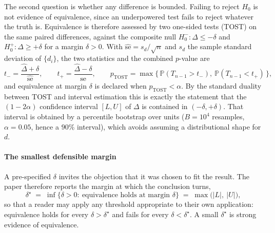 \documentclass[preprint,12pt]{elsarticle}
\begin{document}
The second question is whether any difference is bounded. Failing to reject $H_0$ is not evidence of
equivalence, since an underpowered test fails to reject whatever the truth is. Equivalence is therefore
assessed by two one-sided tests (TOST) on the same paired differences, against the composite null
$H_0^{-}: \Delta \le -\delta$ and $H_0^{+}: \Delta \ge +\delta$ for a margin $\delta > 0$. With
$\widehat{\mathrm{se}} = s_d/\sqrt{n}$ and $s_d$ the sample standard deviation of $\{d_i\}$, the two statistics
and the combined $p$-value are
\begin{equation}
t_{-} = \frac{\hat{\Delta}+\delta}{\widehat{\mathrm{se}}}, \qquad
t_{+} = \frac{\hat{\Delta}-\delta}{\widehat{\mathrm{se}}}, \qquad
p_{\text{TOST}} = \max\!\big\{\,\mathbb{P}(T_{n-1} > t_{-}),\ \mathbb{P}(T_{n-1} < t_{+})\,\big\},
\end{equation}
and equivalence at margin $\delta$ is declared when $p_{\text{TOST}} < \alpha$. By the standard duality between
TOST and interval estimation this is exactly the statement that the $(1-2\alpha)$ confidence interval
$[L, U]$ of $\Delta$ is contained in $(-\delta, +\delta)$. That interval is obtained by a percentile bootstrap
over units ($B = 10^{4}$ resamples, $\alpha = 0.05$, hence a $90\%$ interval), which avoids assuming a
distributional shape for $d$.

\paragraph{The smallest defensible margin} A pre-specified $\delta$ invites the objection that it was chosen
to fit the result. The paper therefore reports the margin at which the conclusion turns,
\begin{equation}\label{eq:dstar}
\delta^\star \;=\; \inf\{\delta > 0:\ \text{equivalence holds at margin } \delta\} \;=\; \max\big(|L|,\ |U|\big),
\end{equation}
so that a reader may apply any threshold appropriate to their own application: equivalence holds for every
$\delta > \delta^\star$ and fails for every $\delta < \delta^\star$. A small $\delta^\star$ is strong evidence
of equivalence.
\end{document}
